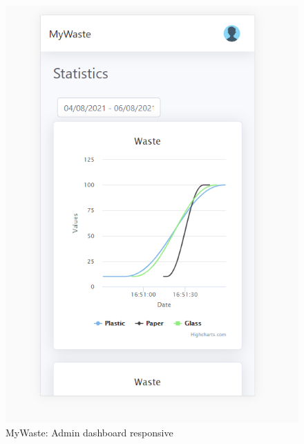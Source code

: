 \documentclass{report}
\begin{document}
\begin{figure}[h!]
    \begin{center}
        \includegraphics[width=1.0\textwidth]{images/adminDashboard_resp1.PNG}  \end{center}
    \caption{MyWaste: Admin dashboard responsive}
    \label{fig:respadmindash1}
\end{figure}
\end{document}
